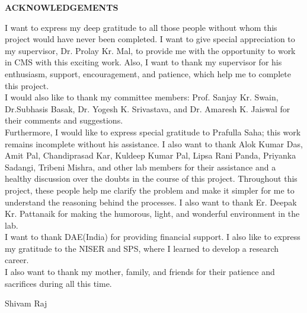 \begin{center}
{\bf ACKNOWLEDGEMENTS}
\end{center}
I want to express my deep gratitude to all those people without whom this project would have never been completed. I want to give special appreciation to my supervisor, Dr. Prolay Kr. Mal, to provide me with the opportunity to work in CMS with this exciting work. Also, I want to thank my supervisor for his enthusiasm, support, encouragement, and patience, which help me to complete this project.\\
I would also like to thank my committee members: Prof. Sanjay Kr. Swain, Dr.Subhasis Basak, Dr. Yogesh K. Srivastava, and Dr. Amaresh K. Jaiswal for their comments and suggestions.\\
Furthermore, I would like to express special gratitude to Prafulla Saha; this work remains incomplete without his assistance. I also want to thank Alok Kumar Das, Amit Pal, Chandiprasad Kar, Kuldeep Kumar Pal, Lipsa Rani Panda, Priyanka Sadangi, Tribeni Mishra, and other lab members for their assistance and a healthy discussion over the doubts in the course of this project. Throughout this project, these people help me clarify the problem and make it simpler for me to understand the reasoning behind the processes. I also want to thank Er. Deepak Kr. Pattanaik for making the humorous, light, and wonderful environment in the lab.\\ 
 I want to thank DAE(India) for providing financial support. I also like to express my gratitude to the NISER and SPS, where I learned to develop a research career.\\
I also want to thank my mother, family, and friends for their patience and sacrifices during all this time.


 \begin{flushright}
 Shivam Raj 
 \end{flushright}                   


                                           

